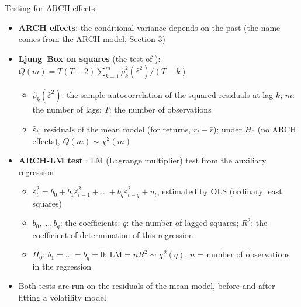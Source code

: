 \begin{frame}{Testing for ARCH effects}
\itemsize{\small}
\begin{itemize}
    \item \textbf{ARCH effects}: the conditional variance depends on the past (the name comes from the ARCH model, Section 3)
    \item \textbf{Ljung--Box on squares} (the test of ): $Q(m) = T(T+2)\sum_{k=1}^{m}\hat\rho_k^2(\hat\varepsilon^2)/(T-k)$
    \begin{itemize}
        \item $\hat\rho_k(\hat\varepsilon^2)$: the sample autocorrelation of the squared residuals at lag $k$; $m$: the number of lags; $T$: the number of observations
        \item $\hat\varepsilon_t$: residuals of the mean model (for returns, $r_t - \bar r$); under $H_0$ (no ARCH effects), $Q(m) \sim \chi^2(m)$
    \end{itemize}
    \item \textbf{ARCH-LM test} : LM (Lagrange multiplier) test from the auxiliary regression
    \begin{itemize}
        \item $\hat\varepsilon_t^2 = b_0 + b_1\hat\varepsilon_{t-1}^2 + \dots + b_q\hat\varepsilon_{t-q}^2 + u_t$, estimated by OLS (ordinary least squares)
        \item $b_0, \dots, b_q$: the coefficients; $q$: the number of lagged squares; $R^2$: the coefficient of determination of this regression
        \item $H_0$: $b_1 = \dots = b_q = 0$; $\mathrm{LM} = n R^2 \sim \chi^2(q)$, $n$ = number of observations in the regression
    \end{itemize}
    \item Both tests are run on the residuals of the mean model, before and after fitting a volatility model
\end{itemize}
\end{frame}


